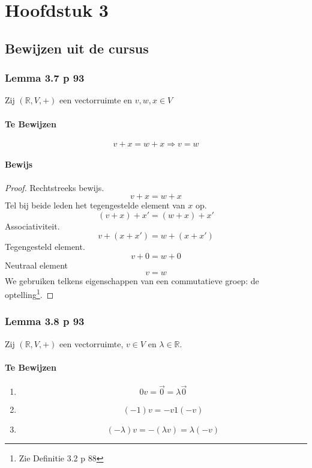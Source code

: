\documentclass[lineaire_algebra_oplossingen.tex]{subfiles}
\begin{document}
\chapter{Hoofdstuk 3}
\section{Bewijzen uit de cursus}
\subsection{Lemma 3.7 p 93}
Zij $(\mathbb{R},V,+)$ een vectorruimte en $v,w,x\in V$
\subsubsection*{Te Bewijzen}
\[
v+x = w+x \Rightarrow v=w
\]
\subsubsection*{Bewijs}
\begin{proof}
Rechtstreeks bewijs.\\
\[
v+x = w+x
\]
Tel bij beide leden het tegengestelde element van $x$ op.
\[
(v+x)+x' = (w+x)+x'
\]
Associativiteit.
\[
v + (x+x') = w+(x+x')
\]
Tegengesteld element.
\[
v + 0 = w+0
\]
Neutraal element
\[
v = w
\]
We gebruiken telkens eigenschappen van een commutatieve groep: de optelling\footnote{Zie Definitie 3.2 p 88}.
\end{proof}

\subsection{Lemma 3.8 p 93}
Zij $(\mathbb{R},V,+)$ een vectorruimte, $v\in V$ en $\lambda \in \mathbb{R}$.
\subsubsection*{Te Bewijzen}
\begin{enumerate}
\item
\[
0v = \vec{0} = \lambda\vec{0}
\]
\item
\[
(-1)v = -v 1(-v)
\]
\item
\[
(-\lambda)v = -(\lambda v ) = \lambda(-v)
\]
\end{enumerate}
\end{document}
